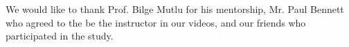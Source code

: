\documentclass{sigchi}
\begin{document}
We would like to thank Prof. Bilge Mutlu for his mentorship, Mr. Paul Bennett who agreed to the be the instructor in our videos, and our friends who participated in the study.

%
%
%
%
%
\balance




\end{document}
